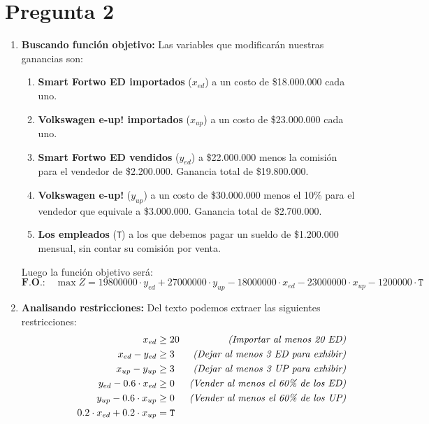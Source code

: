 \documentclass[spanish, fleqn]{article}
\begin{document}
\section{Pregunta 2}
	\begin{enumerate}
		\item
			\textbf{Buscando función objetivo:} Las variables que modificarán
			nuestras ganancias son:
			\begin{enumerate}
				\item
					\textbf{Smart Fortwo ED importados} ($x_{ed}$) a un costo
					de \$18.000.000 cada uno.
				\item
					\textbf{Volkswagen e-up! importados} ($x_{up}$) a un
					costo de \$23.000.000 cada uno.
				\item
					\textbf{Smart Fortwo ED vendidos} ($y_{ed}$) a 
					\$22.000.000 menos la comisión para el vendedor de 
					\$2.200.000. Ganancia total de \$19.800.000.
				\item
					\textbf{Volkswagen e-up!} ($y_{up}$) a un costo de
					\$30.000.000 menos el 10\% para el vendedor que equivale a
					\$3.000.000. Ganancia total de \$2.700.000.
				\item
					\textbf{Los empleados} (\texttt{T}) a los que debemos pagar
					un sueldo de \$1.200.000 mensual, sin contar su comisión por
					venta.
			\end{enumerate}
			Luego la función objetivo será:
			$$ \textbf{F.O.:} \quad
				\max{Z} = 19800000 \cdot y_{ed} + 
						  27000000 \cdot y_{up} - 
						  18000000 \cdot x_{ed} - 
						  23000000 \cdot x_{up} - 
						  1200000 \cdot \texttt{T} $$
		\item 
			\textbf{Analisando restricciones:} Del texto podemos extraer las
			siguientes restricciones: 
			\begin{align}
				\hspace{4cm}
				x_{ed} &\geq 20 &\emph{(Importar al menos 20 ED)} 
				\label{2:1}\\
				x_{ed} - y_{ed} &\geq 3 &\emph{(Dejar al menos 3 ED
				para exhibir)} \label{2:2}\\
				x_{up} - y_{up} &\geq 3 &\emph{(Dejar al menos 3 UP
				para exhibir)} \label{2:3}\\
				y_{ed} - 0.6 \cdot x_{ed} &\geq 0 &\emph{(Vender al
				menos el 60\% de los ED)} \label{2:4}\\
				y_{up} - 0.6 \cdot x_{up} &\geq 0 &\emph{(Vender al
				menos el 60\% de los UP)} \label{2:5}\\
				0.2 \cdot x_{ed} + 0.2 \cdot x_{up} &= \texttt{T}

\end{align}
\end{enumerate}
\end{document}
